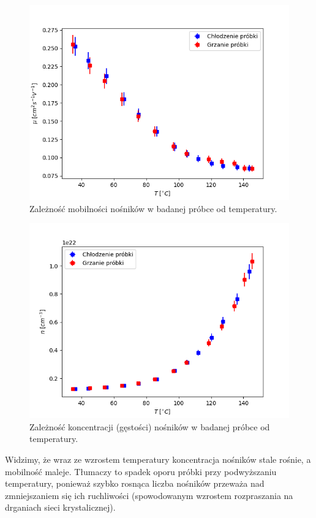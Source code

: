 \documentclass[12pt]{article}
\begin{document}
\begin{figure}[H]
    \centering
    \includegraphics[scale=0.5]{temp_mobility}
    \caption{Zależność mobilności nośników w badanej próbce od temperatury.}
    \label{fig:temp_mobility}
\end{figure}

\begin{figure}[H]
    \centering
    \includegraphics[scale=0.5]{temp_concentration}
    \caption{Zależność koncentracji (gęstości) nośników w badanej próbce od temperatury.}
    \label{fig:temp_concentration}
\end{figure}

Widzimy, że wraz ze wzrostem temperatury koncentracja nośników stale rośnie, a mobilność maleje. Tłumaczy to spadek oporu próbki przy podwyższaniu temperatury, ponieważ szybko rosnąca liczba nośników przeważa nad zmniejszaniem się ich ruchliwości (spowodowanym wzrostem rozpraszania na drganiach sieci krystalicznej).
\end{document}

